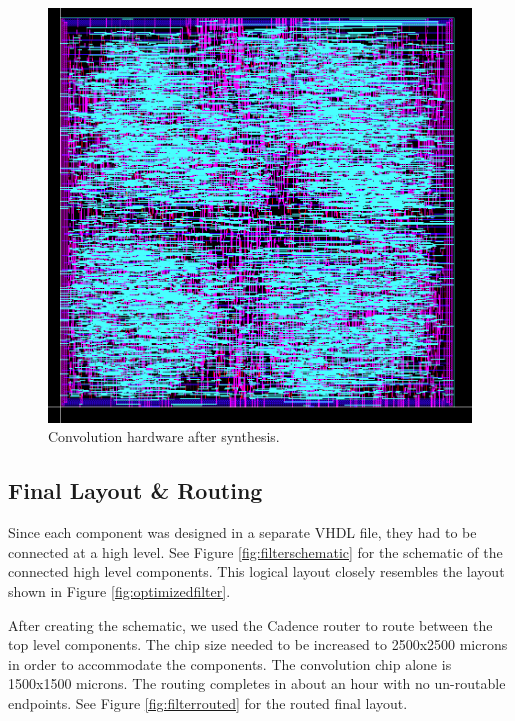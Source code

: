 \begin{figure}[htbp]
\centering
\includegraphics[width=6.5in]{images/CONV_MULT}
\caption{Convolution hardware after synthesis.}
\label{fig:convmult}
\end{figure}


\subsection{Final Layout \& Routing}
Since each component was designed in a separate VHDL file, they had to be connected at a high level.  See Figure \ref{fig:filterschematic} for the schematic of the connected high level components.  This logical layout closely resembles the layout shown in Figure \ref{fig:optimizedfilter}.

After creating the schematic, we used the Cadence router to route between the top level components.  The chip size needed to be increased to 2500x2500 microns in order to accommodate the components.  The convolution chip alone is 1500x1500 microns.  The routing completes in about an hour with no un-routable endpoints.  See Figure \ref{fig:filterrouted} for the routed final layout.


